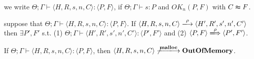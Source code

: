 \begin{myDef}
  \label{df:Rdu}
 we write \( \Theta; \Gamma \vdash \langle H, R, s, n, C \rangle : \langle P,
  F \rangle\), if \(\Theta; \Gamma \vdash s : P\) and \(OK_n(P, F)\) with \(C \thickapprox F\).  
\end{myDef}

 
\begin{lemma}[Preservation]
\label{lem:preservation}
suppose that \( \Theta; \Gamma \vdash \langle H, R, s, n, C \rangle :
\langle P, F \rangle\). If \( \langle H, R, s, n, C \rangle
\xlongrightarrow{\rho} \langle H', R', s', n', C' \rangle\) then
\(\exists P', F'\) s.t. (1) \( \Theta; \Gamma \vdash \langle H', R',
s', n', C' \rangle : \langle P', F' \rangle\) and (2) \(\langle P, F
\rangle \xLongrightarrow{\rho} \langle P', F'\rangle \).
\end{lemma}



\begin{lemma}
\label{lem:immediateSafety}
If \( \Theta; \Gamma \vdash \langle H, R, s, n, C \rangle :
\langle P, F \rangle\), then \(\langle H, R, s, n, C \rangle
\not\xlongrightarrow{\Malloc} \OVERFLOW \).
\end{lemma}

